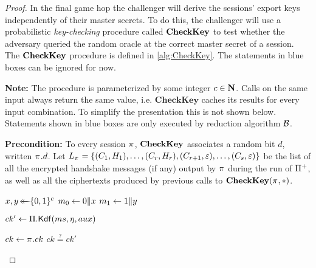 \begin{proof}
In the final game hop the challenger will derive the sessions' export keys independently of their master secrets.
To do this,
the challenger will use a probabilistic \emph{key-checking} procedure called $\CK$ to test whether the adversary queried the random oracle at the correct master secret of a session.
The $\CK$ procedure is defined in \cref{alg:CheckKey}.
The statements in blue boxes can be ignored for now.

\begin{algorithm}


\caption{$\CK(\oracle, ms)$}
\label{alg:CheckKey}

\medskip

\textbf{Note:} The procedure is parameterized by some integer $c \in \N$.
Calls on the same input always return the same value,
i.e.
$\mathbf{CheckKey}$ caches its results for every input combination.
To simplify the presentation this is not shown below.
Statements shown in blue boxes are only executed by reduction algorithm $\A[B]$.

\medskip

\textbf{Precondition:} 
To every session $\oracle$,
$\CK$ associates a random bit $d$,
written $\oracle.d$.
Let $L_{\oracle} = \lbrace (C_{1}, H_1), \dotsc, (C_r,H_r), (C_{r+1}, \emptystring), \dotsc, (C_s, \emptystring) \rbrace$ be the list of all the encrypted handshake messages (if any) output by $\oracle$ during the run of $\protocolderived$,
as well as all the ciphertexts produced by previous calls to  $\CK(\oracle,*)$.



\begin{algorithmic}[1]
	\Statex
	
	\State $x,y \getsr \bits^{c}$
	\State $m_0 \gets 0 \concat x$
	\State $m_1 \gets 1 \concat y$
	\State

	\State {}
	\State\label{alg:CheckKey_derive_key}$ck' \gets \protocol.\mathsf{Kdf}(ms, \nonce, aux)$
	\State
	

		\State $ck \gets \oracle.ck$ 	\hspace{1em} 	 \label{alg:CheckKey:obtain_ck}	
		\State \Return $ck \overset{?}{=} ck'$\label{alg:CheckKey:compare_CKs}	
	\Else
		

\end{algorithmic}
\end{algorithm}
\end{proof}

